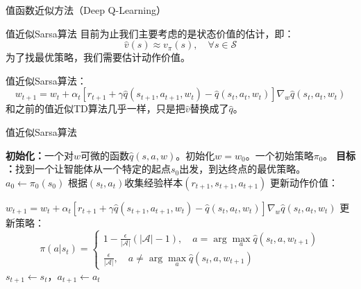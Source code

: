 \begin{section}{值函数近似方法\alert{（Deep Q-Learning）}}
\begin{frame}{值近似Sarsa算法}
    目前为止我们主要考虑的是状态价值的估计，即：
    \[
        \hat{v}(s)\approx v_\pi(s),\quad \forall s\in \mathcal{S}
    \]
    为了找最优策略，我们需要估计动作价值。

    值近似Sarsa算法：
    \alert{\[
        w_{t+1}=w_t+\alpha_t[r_{t+1}+\gamma \hat{q}(s_{t+1},a_{t+1},w_t)-\hat{q}(s_t,a_t,w_t)]\nabla_w\hat{q}(s_t,a_t,w_t)
    \]}
    和之前的值近似TD算法几乎一样，只是把$\hat{v}$替换成了$\hat{q}$。
\end{frame}

\begin{frame}{值近似Sarsa算法}
    \begin{algorithmic}[1]
        \State \textbf{初始化：}一个对$w$可微的函数$\hat{q}(s,a,w)$。初始化$w=w_0$。一个初始策略$\pi_0$。
        \State \textbf{目标 ：}找到一个让智能体从一个特定的起点$s_0$出发，到达终点的最优策略。
            \State $a_0\leftarrow\pi_0(s_0)$
                \State 根据$(s_t,a_t)$收集经验样本$(r_{t+1}, s_{t+1},a_{t+1})$
                \State 更新动作价值：

                $w_{t+1}=w_t+\alpha_t[r_{t+1}+\gamma \hat{q}(s_{t+1},a_{t+1},w_t)-\hat{q}(s_t,a_t,w_t)]\nabla_w\hat{q}(s_t,a_t,w_t)$
                \State 更新策略：
                \[
                    \pi(a|s_t)=\begin{cases}
                        1-\frac{\epsilon}{|\mathcal{A}|}(|\mathcal{A}|-1),\quad a=\arg\max_{a}\hat{q}(s_t,a,w_{t+1}) \\
                        \frac{\epsilon}{|\mathcal{A}|},\quad a \neq \arg\max_{a}\hat{q}(s_t,a,w_{t+1})
                    \end{cases}
                \]
                \State $s_{t+1}\leftarrow s_t$，$a_{t+1}\leftarrow a_t$
            \EndWhile
        \EndFor
    \end{algorithmic}
\end{frame}


\end{section}
